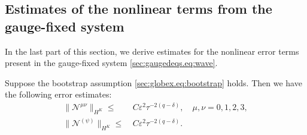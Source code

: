 \documentclass{article}
\newcommand{\mc}{\mathcal}
\newcommand{\ve}{\varepsilon}
\begin{document}
\subsection{Estimates of the nonlinear terms from the gauge-fixed system}
In the last part of this section, we derive estimates for the nonlinear error terms present in the gauge-fixed system \eqref{sec:gaugedeqs.eq:wave}.
\begin{proposition}\label{sec:bootbound.prop:errorests}
    Suppose the bootstrap assumption \eqref{sec:globex.eq:bootstrap} holds. Then we have the following error estimates:
    \begin{subequations}
        \begin{align}
            \|\mc{N}^{\mu\nu}\|_{H^K} \leq&\> C\ve^2 \tau^{-2(q-\delta)}, \quad \mu,\nu = 0,1,2,3,\label{sec:bootbound.eq:errorests1}\\
            \|\mc{N}^{(\psi)}\|_{H^K} \leq&\> C\ve^2 \tau^{-2(q-\delta)}.\label{sec:bootbound.eq:errorests2}
        \end{align}
    \end{subequations}
\end{proposition}
\end{document}
